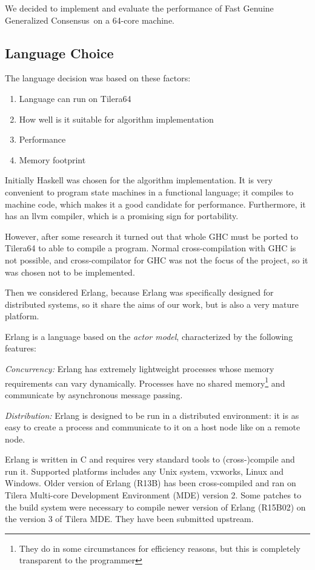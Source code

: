 \documentclass[english,11pt]{article}
\newcommand{\fggc}{Fast Genuine Generalized Consensus\ }
\begin{document}
We decided to implement and evaluate the performance of \fggc on a 64-core
machine.

\subsection{Language Choice}

The language decision was based on these factors:
\begin{enumerate}
    \item Language can run on Tilera64
    \item How well is it suitable for algorithm implementation
    \item Performance
    \item Memory footprint
\end{enumerate}

Initially Haskell was chosen for the algorithm implementation. It is very
convenient to program state machines in a functional language; it compiles to
machine code, which makes it a good candidate for performance. Furthermore, it
has an llvm compiler, which is a promising sign for portability.

However, after some research it turned out that whole GHC must be ported to
Tilera64 to able to compile a program. Normal cross-compilation with GHC is not
possible, and cross-compilator for GHC was not the focus of the project, so it
was chosen not to be implemented.

Then we considered Erlang, because Erlang was specifically designed for
distributed systems, so it share the aims of our work, but is also a very
mature platform.

Erlang is a language based on the  {\em actor model}, characterized by the
following features:

{\em Concurrency:} Erlang has extremely lightweight processes whose memory
requirements can vary dynamically. Processes have no shared
memory\footnote{They do in some circumstances for efficiency reasons, but this
is completely transparent to the programmer} and communicate by asynchronous
message passing.

{\em Distribution:} Erlang is designed to be run in a distributed
environment: it is as easy to create a process and communicate to
it on a host node like on a remote node.

Erlang is written in C and requires very standard tools to (cross-)compile and
run it. Supported platforms includes any Unix system, vxworks, Linux and
Windows. Older version of Erlang (R13B) has been cross-compiled and ran on
Tilera Multi-core Development Environment (MDE) version 2. Some patches to the
build system were necessary to compile newer version of Erlang (R15B02) on the
version 3 of Tilera MDE. They have been submitted upstream.
\end{document}
